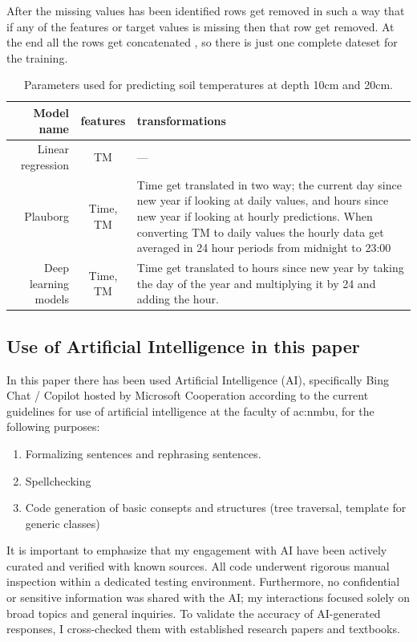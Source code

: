 After the missing values has been identified rows get removed in such a way that if any of the features or target values is missing then that row get removed. At the end all the rows get concatenated , so there is just one complete dateset for the training. 

\begin{table}[H]
	\centering
	\begin{tabular}{|r|c| p{6cm}|}
		\hline Model name & features & transformations \\\hline\hline
		Linear regression & TM & --- \\\hline
		Plauborg & Time, TM & Time get translated in two way; the current day since new year if looking at daily values, and hours since new year if looking at hourly predictions. When converting TM to daily values the hourly data get averaged in 24 hour periods from midnight to 23:00\\\hline
		Deep learning models &Time, TM& Time get translated to hours since new year by taking the day of the year and multiplying it by 24 and adding the hour.\\\hline
	\end{tabular}
	\caption[Model parameters]{Parameters used for predicting soil temperatures at depth 10cm and 20cm.}
	\label{tab:model_trans}
\end{table}

\subsection[Use of AI]{Use of Artificial Intelligence in this paper}

In this paper there has been used Artificial Intelligence (AI), specifically Bing Chat / Copilot hosted by Microsoft Cooperation according to the current guidelines for use of artificial intelligence at the faculty of \acrfull{ac:nmbu}, for the following purposes:

\begin{enumerate}
	\item Formalizing sentences and rephrasing sentences.
	\item Spellchecking
	\item Code generation of basic consepts and structures (tree traversal, template for generic classes) 
\end{enumerate}

It is important to emphasize that my engagement with AI have been actively curated and verified with known sources. All code underwent rigorous manual inspection within a dedicated testing environment. Furthermore, no confidential or sensitive information was shared with the AI; my interactions focused solely on broad topics and general inquiries. To validate the accuracy of AI-generated responses, I cross-checked them with established research papers and textbooks.
